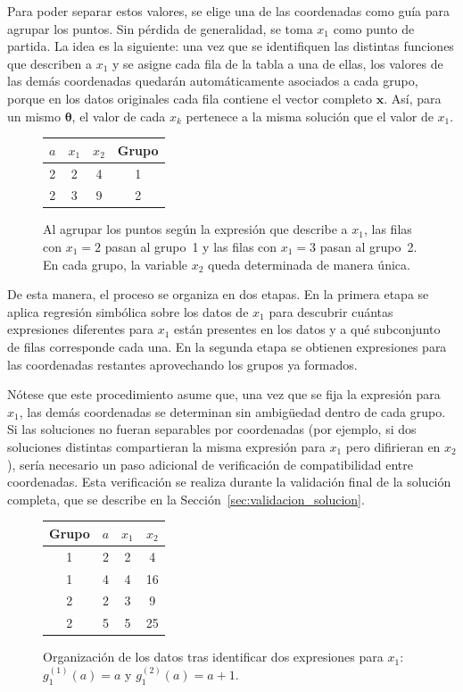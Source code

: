 \documentclass{article} \usepackage[utf8]{inputenc} \usepackage[spanish]{babel} \spanishdecimal{.} \usepackage{amsmath, amssymb, amsthm} \usepackage{bm} \usepackage{float} \usepackage{longtable} \usepackage[hidelinks]{hyperref}
\newcommand{\xvec}{\mathbf{x}} \newcommand{\thetavec}{\boldsymbol{\theta}} \newcommand{\Fvec}{\mathbf{F}} \newcommand{\R}{\mathbb{R}} \newcommand{\norm}[1]{\left\lVert#1\right\rVert} \newcommand{\loss}{\mathcal{L}} \newcommand{\dataset}{\mathcal{D}} \newcommand{\jac}{\mathbf{J}}
\begin{document}
Para poder separar estos valores, se elige una de las coordenadas
como guía para agrupar los puntos. Sin pérdida de generalidad, se
toma \(x_1\) como punto de partida. La idea es la siguiente: una vez
que se identifiquen las distintas funciones que describen a \(x_1\) y
se asigne cada fila de la tabla a una de ellas, los valores de las
demás coordenadas quedarán automáticamente asociados a cada grupo,
porque en los datos originales cada fila contiene el vector completo
\(\xvec\). Así, para un mismo \(\thetavec\), el valor de cada \(x_k\)
pertenece a la misma solución que el valor de \(x_1\).

\begin{figure}[H]
\centering
\begin{tabular}{c|c|c|c}
$a$ & $x_1$ & $x_2$ & Grupo \\
\hline
2 & 2 & 4 & 1 \\
2 & 3 & 9 & 2 \\
\end{tabular}
\caption{Al agrupar los puntos según la expresión que describe a
\(x_1\), las filas con \(x_1 = 2\) pasan al grupo~1 y las filas con
\(x_1 = 3\) pasan al grupo~2. En cada grupo, la variable \(x_2\)
queda determinada de manera única.}
\label{fig:agrupacion_coordenadas}
\end{figure}

De esta manera, el proceso se organiza en dos etapas. En la primera
etapa se aplica regresión simbólica sobre los datos de \(x_1\) para
descubrir cuántas expresiones diferentes para \(x_1\) están presentes
en los datos y a qué subconjunto de filas corresponde cada una. En la
segunda etapa se obtienen expresiones para las coordenadas restantes
aprovechando los grupos ya formados.

Nótese que este procedimiento asume que, una vez que se fija la
expresión para \(x_1\), las demás coordenadas se determinan sin
ambigüedad dentro de cada grupo. Si las soluciones no fueran
separables por coordenadas (por ejemplo, si dos soluciones distintas
compartieran la misma expresión para \(x_1\) pero difirieran en
\(x_2\)), sería necesario un paso adicional de verificación de
compatibilidad entre coordenadas. Esta verificación se realiza durante
la validación final de la solución completa, que se describe en la
Sección~\ref{sec:validacion_solucion}.

\begin{figure}[H]
\centering
\caption{Organización de los datos tras identificar dos expresiones
para \(x_1\): \(g_1^{(1)}(a) = a\) y \(g_1^{(2)}(a) = a + 1\).}
\label{fig:tabla_organizada}
\begin{tabular}{c|c|c|c}
Grupo & \(a\) & \(x_1\) & \(x_2\) \\
\hline
1 & 2 & 2 & 4 \\
1 & 4 & 4 & 16 \\[4pt]
2 & 2 & 3 & 9 \\
2 & 5 & 5 & 25
\end{tabular}
\end{figure}
\end{document}
